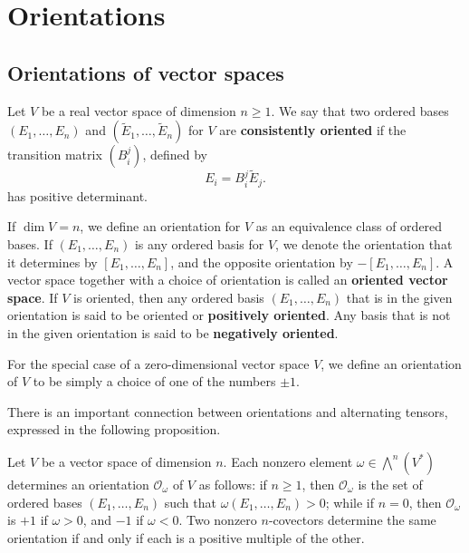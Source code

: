 \section{Orientations}
\subsection{Orientations of vector spaces}
Let $V$ be a real vector space of dimension $n\geq 1$. We say that two ordered bases $(E_1,\dots,E_n)$ and $(\widetilde{E}_1,\dots,\widetilde{E}_n)$ for $V$ are \textbf{consistently oriented} if the transition matrix $(B_i^j)$, defined by
\[E_i=B_i^j\widetilde{E}_j.\]
has positive determinant.\par
If $\dim V=n$, we define an orientation for $V$ as an equivalence class of ordered bases. If $(E_1,\dots,E_n)$ is any ordered basis for $V$, we denote the orientation that it determines by $[E_1,\dots,E_n]$, and the opposite orientation by $-[E_1,\dots,E_n]$. A vector space together with a choice of orientation is called an \textbf{oriented vector space}. If $V$ is oriented, then any ordered basis $(E_1,\dots,E_n)$ that is in the given orientation is said to be oriented or \textbf{positively oriented}. Any basis that is not in the given orientation is said to be \textbf{negatively oriented}.\par
For the special case of a zero-dimensional vector space $V$, we define an orientation
of $V$ to be simply a choice of one of the numbers $\pm1$.\par
There is an important connection between orientations and alternating tensors,
expressed in the following proposition.
\begin{proposition}\label{orientation vector space form}
Let $V$ be a vector space of dimension $n$. Each nonzero element $\omega\in\bigwedge^n(V^*)$ determines an orientation $\mathcal{O}_\omega$ of $V$ as follows: if $n\geq1$, then $\mathcal{O}_\omega$ is the set of ordered bases $(E_1,\dots,E_n)$ such that $\omega(E_1,\dots,E_n)>0$; while if $n=0$, then $\mathcal{O}_\omega$ is $+1$ if $\omega>0$, and $-1$ if $\omega<0$. Two nonzero $n$-covectors determine the same orientation if and only if each is a positive multiple of the other.
\end{proposition}
